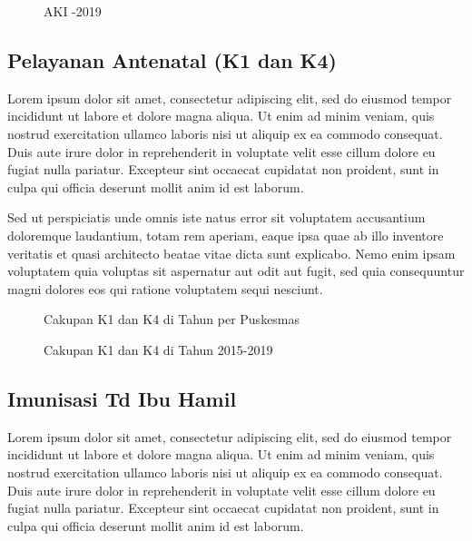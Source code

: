 \begin{figure}[H]
    \centering{}
    \caption{AKI -2019}
    \label{fig:AKI-2015-2019}
\end{figure}

\subsection{Pelayanan Antenatal (K1 dan K4)}
Lorem ipsum dolor sit amet, consectetur adipiscing elit, sed do eiusmod tempor incididunt ut labore et dolore magna aliqua. Ut enim ad minim veniam, quis nostrud exercitation ullamco laboris nisi ut aliquip ex ea commodo consequat. Duis aute irure dolor in reprehenderit in voluptate velit esse cillum dolore eu fugiat nulla pariatur. Excepteur sint occaecat cupidatat non proident, sunt in culpa qui officia deserunt mollit anim id est laborum.

Sed ut perspiciatis unde omnis iste natus error sit voluptatem accusantium doloremque laudantium, totam rem aperiam, eaque ipsa quae ab illo inventore veritatis et quasi architecto beatae vitae dicta sunt explicabo. Nemo enim ipsam voluptatem quia voluptas sit aspernatur aut odit aut fugit, sed quia consequuntur magni dolores eos qui ratione voluptatem sequi nesciunt.

\begin{figure}[H]
    \centering{}
    \caption{Cakupan K1 dan K4 di \namaKabupaten Tahun \tP per Puskesmas}
    \label{fig:Cakupan-K1-K4}
\end{figure}

\begin{figure}[H]
    \centering{}
    \caption{Cakupan K1 dan K4 di \namaKabupaten Tahun 2015-2019}
    \label{fig:Cakupan-K1-K4-2015-2019}
\end{figure}

\subsection{Imunisasi Td Ibu Hamil}
Lorem ipsum dolor sit amet, consectetur adipiscing elit, sed do eiusmod tempor incididunt ut labore et dolore magna aliqua. Ut enim ad minim veniam, quis nostrud exercitation ullamco laboris nisi ut aliquip ex ea commodo consequat. Duis aute irure dolor in reprehenderit in voluptate velit esse cillum dolore eu fugiat nulla pariatur. Excepteur sint occaecat cupidatat non proident, sunt in culpa qui officia deserunt mollit anim id est laborum.

